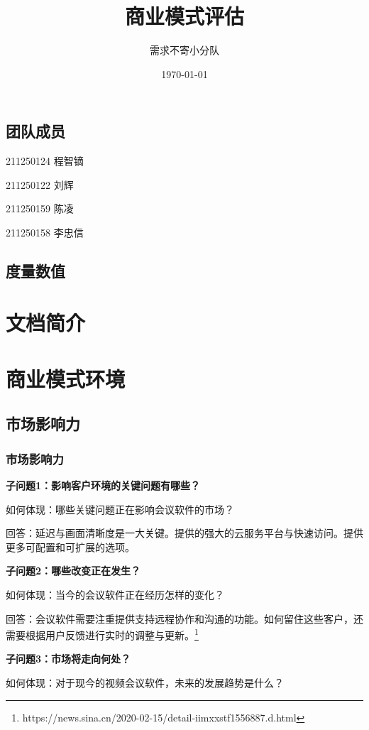 \documentclass[a4paper,12pt]{article}
\title{商业模式评估}
\author{需求不寄小分队}
\date{\today}
\begin{document}
    \maketitle

    \tableofcontents

    \subsection{团队成员}
    211250124 程智镝

    211250122 刘辉

    211250159 陈凌

    211250158 李忠信
    \subsection{度量数值}

    \section{文档简介}
    

     \section{商业模式环境}
    \subsection{市场影响力}
    \subsubsection{市场影响力}
    \textbf{子问题1：影响客户环境的关键问题有哪些？}
    
    如何体现：哪些关键问题正在影响会议软件的市场？
    
    回答：延迟与画面清晰度是一大关键。提供的强大的云服务平台与快速访问。提供更多可配置和可扩展的选项。
    
    \textbf{子问题2：哪些改变正在发生？}

    如何体现：当今的会议软件正在经历怎样的变化？

    回答：会议软件需要注重提供支持远程协作和沟通的功能。如何留住这些客户，还需要根据用户反馈进行实时的调整与更新。\footnote{https://news.sina.cn/2020-02-15/detail-iimxxstf1556887.d.html}
    
    

    
    \textbf{子问题3：市场将走向何处？}

    如何体现：对于现今的视频会议软件，未来的发展趋势是什么？
\end{document}
